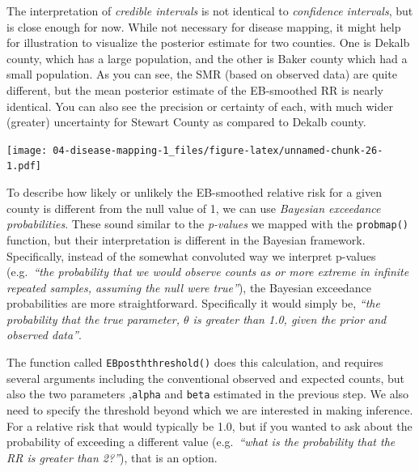 \documentclass[
]{book}
\newenvironment{Shaded}{\begin{snugshade}}{\end{snugshade}}
\newcommand{\AttributeTok}[1]{\textcolor[rgb]{0.77,0.63,0.00}{#1}}
\newcommand{\DecValTok}[1]{\textcolor[rgb]{0.00,0.00,0.81}{#1}}
\newcommand{\FunctionTok}[1]{\textcolor[rgb]{0.00,0.00,0.00}{#1}}
\newcommand{\NormalTok}[1]{#1}
\newcommand{\OtherTok}[1]{\textcolor[rgb]{0.56,0.35,0.01}{#1}}
\newcommand{\SpecialCharTok}[1]{\textcolor[rgb]{0.00,0.00,0.00}{#1}}
\begin{document}
The interpretation of \emph{credible intervals} is not identical to \emph{confidence intervals}, but is close enough for now. While not necessary for disease mapping, it might help for illustration to visualize the posterior estimate for two counties. One is Dekalb county, which has a large population, and the other is Baker county which had a small population. As you can see, the SMR (based on observed data) are quite different, but the mean posterior estimate of the EB-smoothed RR is nearly identical. You can also see the precision or certainty of each, with much wider (greater) uncertainty for Stewart County as compared to Dekalb county.

\texttt{[image: 04-disease-mapping-1\_files/figure-latex/unnamed-chunk-26-1.pdf]}

To describe how likely or unlikely the EB-smoothed relative risk for a given county is different from the null value of 1, we can use \emph{Bayesian exceedance probabilities}. These sound similar to the \emph{p-values} we mapped with the \texttt{probmap()} function, but their interpretation is different in the Bayesian framework. Specifically, instead of the somewhat convoluted way we interpret p-values (e.g.~\emph{``the probability that we would observe counts as or more extreme in infinite repeated samples, assuming the null were true''}), the Bayesian exceedance probabilities are more straightforward. Specifically it would simply be, \emph{``the probability that the true parameter, \(\theta\) is greater than 1.0, given the prior and observed data''}.

The function called \texttt{EBposththreshold()} does this calculation, and requires several arguments including the conventional observed and expected counts, but also the two parameters ,\texttt{alpha} and \texttt{beta} estimated in the previous step. We also need to specify the threshold beyond which we are interested in making inference. For a relative risk that would typically be 1.0, but if you wanted to ask about the probability of exceeding a different value (e.g.~\emph{``what is the probability that the RR is greater than 2?''}), that is an option.

\begin{Shaded}
\end{Shaded}
\end{document}
